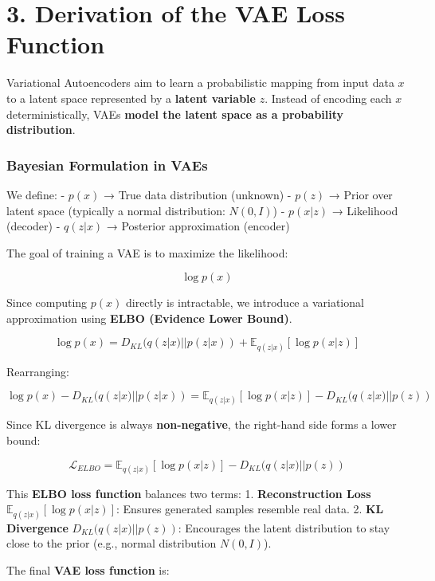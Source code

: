 \documentclass[
]{book}
\begin{document}
\chapter{3. Derivation of the VAE Loss Function}\label{derivation-of-the-vae-loss-function}

Variational Autoencoders aim to learn a probabilistic mapping from input data \(x\) to a latent space represented by a \textbf{latent variable} \(z\). Instead of encoding each \(x\) deterministically, VAEs \textbf{model the latent space as a probability distribution}.

\subsection{\texorpdfstring{\textbf{Bayesian Formulation in VAEs}}{Bayesian Formulation in VAEs}}\label{bayesian-formulation-in-vaes}

We define:
- \(p(x)\) → True data distribution (unknown)
- \(p(z)\) → Prior over latent space (typically a normal distribution: \(N(0, I)\))
- \(p(x | z)\) → Likelihood (decoder)
- \(q(z | x)\) → Posterior approximation (encoder)

The goal of training a VAE is to maximize the likelihood:

\[
\log p(x)
\]

Since computing \(p(x)\) directly is intractable, we introduce a variational approximation using \textbf{ELBO (Evidence Lower Bound)}.

\[
\log p(x) = D_{KL} ( q(z | x) || p(z | x) ) + \mathbb{E}_{q(z|x)} [\log p(x | z)]
\]

Rearranging:

\[
\log p(x) - D_{KL} ( q(z | x) || p(z | x) ) = \mathbb{E}_{q(z|x)} [\log p(x | z)] - D_{KL}(q(z | x) || p(z))
\]

Since KL divergence is always \textbf{non-negative}, the right-hand side forms a lower bound:

\[
\mathcal{L}_{ELBO} = \mathbb{E}_{q(z|x)} [\log p(x | z)] - D_{KL}(q(z | x) || p(z))
\]

This \textbf{ELBO loss function} balances two terms:
1. \textbf{Reconstruction Loss} \(\mathbb{E}_{q(z|x)} [\log p(x | z)]\): Ensures generated samples resemble real data.
2. \textbf{KL Divergence} \(D_{KL}(q(z | x) || p(z))\): Encourages the latent distribution to stay close to the prior (e.g., normal distribution \(N(0, I)\)).

The final \textbf{VAE loss function} is:
\end{document}
